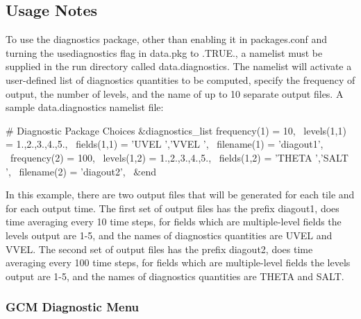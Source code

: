 \subsection{Usage Notes}
\label{sec:diagnostics:usersguide}
To use the diagnostics package, other than enabling it in packages.conf
and turning the usediagnostics flag in data.pkg to .TRUE., a namelist
must be supplied in the run directory called data.diagnostics. The namelist
will activate a user-defined list of diagnostics quantities to be computed,
specify the frequency of output, the number of levels, and the name of
up to 10 separate output files. A sample data.diagnostics namelist file:

$\#$ Diagnostic Package Choices
 $\&$diagnostics\_list
  frequency(1) = 10, \
   levels(1,1) = 1.,2.,3.,4.,5., \
   fields(1,1) = 'UVEL    ','VVEL    ', \
   filename(1) = 'diagout1', \
  frequency(2) = 100, \
   levels(1,2) = 1.,2.,3.,4.,5., \
   fields(1,2) = 'THETA   ','SALT    ', \
   filename(2) = 'diagout2', \
 $\&$end \

In this example, there are two output files that will be generated
for each tile and for each output time. The first set of output files
has the prefix diagout1, does time averaging every 10 time steps,
for fields which are multiple-level fields the levels output are 1-5,
and the names of diagnostics quantities are UVEL and VVEL.
The second set of output files
has the prefix diagout2, does time averaging every 100 time steps,
for fields which are multiple-level fields the levels output are 1-5,
and the names of diagnostics quantities are THETA and SALT.

\newpage

\subsubsection{GCM Diagnostic Menu}
\label{sec:diagnostics:menu}

